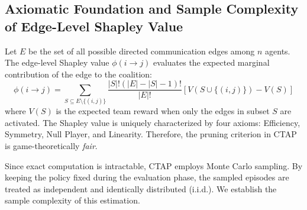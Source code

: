 \documentclass{article}
\begin{document}
\subsection{Axiomatic Foundation and Sample Complexity of Edge-Level Shapley Value}
Let $E$ be the set of all possible directed communication edges among $n$ agents. The edge-level Shapley value $\phi(i \to j)$ evaluates the expected marginal contribution of the edge to the coalition:
\begin{equation}
    \phi(i \to j) = \sum_{S \subseteq E \setminus \{(i,j)\}} \frac{|S|!(|E|-|S|-1)!}{|E|!} \left[ V(S \cup \{(i,j)\}) - V(S) \right]
\end{equation}
where $V(S)$ is the expected team reward when only the edges in subset $S$ are activated. The Shapley value is uniquely characterized by four axioms: Efficiency, Symmetry, Null Player, and Linearity. Therefore, the pruning criterion in CTAP is game-theoretically \textit{fair}. 

Since exact computation is intractable, CTAP employs Monte Carlo sampling. By keeping the policy fixed during the evaluation phase, the sampled episodes are treated as independent and identically distributed (i.i.d.). We establish the sample complexity of this estimation.
\end{document}
